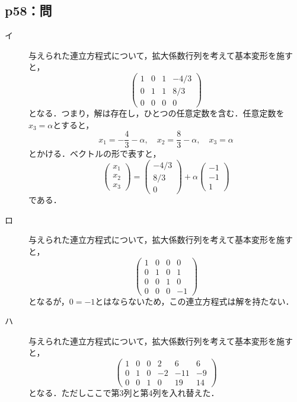 \documentclass[uplatex,dvipdfmx,a4paper,10pt,fleqn]{jsarticle}
\begin{document}
    \newpage 


    \subsection*{p58：問}

    \begin{tleftbar}
        \begin{description}
            \item[イ] 与えられた連立方程式について，拡大係数行列を考えて基本変形を施すと，
            \[
                \begin{pmatrix} 1 & 0 & 1 & -4/3 \\ 0 & 1 & 1 & 8/3 \\ 0 & 0 & 0 & 0 \end{pmatrix}
            \]
            となる．つまり，解は存在し，ひとつの任意定数を含む．任意定数を$ x_3 =\alpha$とすると，
            \[
                x_1 = -\frac{4}{3} - \alpha,\quad x_2 = \frac{8}{3} - \alpha,\quad x_3 = \alpha
            \]
            とかける．ベクトルの形で表すと，
            \[
                \begin{pmatrix} x_1 \\ x_2 \\ x_3 \end{pmatrix} = \begin{pmatrix} -4/3 \\ 8/3 \\ 0 \end{pmatrix} + \alpha \begin{pmatrix} -1 \\ -1 \\ 1 \end{pmatrix}
            \]
            である．
            \item[ロ] 与えられた連立方程式について，拡大係数行列を考えて基本変形を施すと，
            \[
                \begin{pmatrix} 1 & 0 & 0 & 0 \\ 0 & 1& 0 & 1 \\ 0 & 0 & 1 & 0 \\ 0 & 0 & 0 & -1 \end{pmatrix}
            \]
            となるが，$0 = -1$とはならないため，この連立方程式は解を持たない．
            \item[ハ] 与えられた連立方程式について，拡大係数行列を考えて基本変形を施すと，
            \[
                \begin{pmatrix} 1 & 0 & 0 & 2 & 6 & 6 \\ 0 & 1& 0 & -2 & -11 & -9 \\ 0 & 0 & 1 & 0 & 19 & 14 \end{pmatrix}
            \]
            となる．ただしここで第3列と第4列を入れ替えた．
            

\end{description}
\end{tleftbar}
\end{document}

